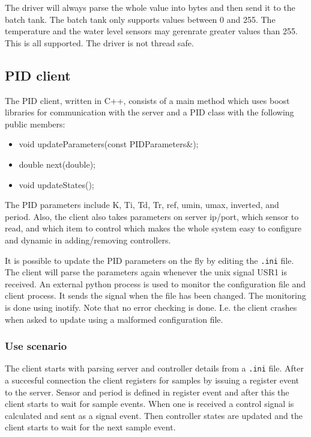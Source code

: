 \documentclass{article}
\begin{document}
The driver will always parse the whole value into bytes and then send it to the
batch tank. The batch tank only supports values between 0 and 255. The
temperature and the water level sensors may gerenrate greater values than 255.
This is all supported. The driver is not thread safe.


\subsection{PID client}
The PID client, written in C++, consists of a main method which uses boost
libraries for communication with the server and a PID class with the following
public members:
\begin{itemize}
\item{void updateParameters(const PIDParameters\&);}
\item{double next(double);}
\item{void updateStates();}
\end{itemize}

The PID parameters include K, Ti, Td, Tr, ref, umin, umax, inverted, and period.
Also, the client also takes parameters on server ip/port, which sensor to read,
and which item to control which makes the whole system easy to configure and 
dynamic in adding/removing controllers.

It is possible to update the PID parameters on the fly by editing the 
\verb+.ini+ file.
The client will parse the parameters again whenever the unix signal USR1 is
received. An external python process is used to monitor the configuration file
and client process. It sends the signal when the file has been changed. The
monitoring is done using inotify.
Note that no error checking is done. I.e. the client crashes when asked
to update using a malformed configuration file. 




\subsubsection{Use scenario}
The client starts with parsing server and controller details from a
\verb+.ini+ file. After a succesful connection the client registers for
samples by issuing a register event to the server. Sensor and period
is defined in register event and after this the client starts to wait
for sample events. When one is received a control signal is calculated
and sent as a signal event. Then controller states are updated and the
client starts to wait for the next sample event.
\end{document}
